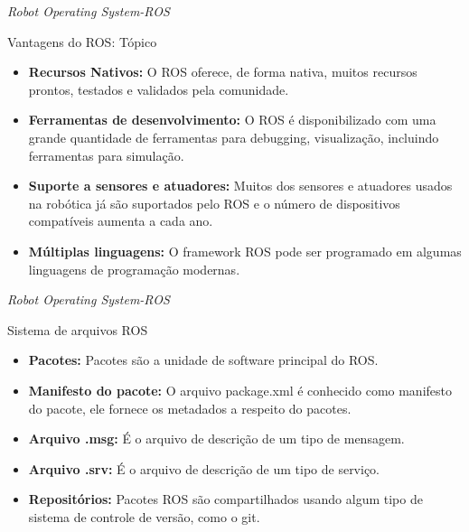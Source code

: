 \documentclass[10pt]{beamer}
\begin{document}
\begin{frame}{\textit{Robot Operating System-ROS}}
	\begin{alertblock}{Vantagens do ROS: Tópico}
		\vspace{0.2cm}
		\begin{itemize}
			\setlength\itemsep{0.7em}
			\item \textbf{Recursos Nativos:} O ROS oferece, de forma nativa, muitos recursos prontos,
			testados e validados pela comunidade.
			\item \textbf{Ferramentas de desenvolvimento:} O ROS é disponibilizado com uma grande quantidade de ferramentas para debugging, visualização, incluindo ferramentas para simulação.
			\item \textbf{Suporte a sensores e atuadores:} Muitos dos sensores e atuadores usados na robótica já são suportados pelo ROS e o número de dispositivos compatíveis aumenta a cada ano.
			\item \textbf{Múltiplas linguagens:} O framework ROS pode ser programado em algumas linguagens de programação modernas.
		\end{itemize}
	\end{alertblock}
\end{frame}

\begin{frame}{\textit{Robot Operating System-ROS}}
	\begin{alertblock}{Sistema de arquivos ROS}
		\vspace{0.2cm}
		\begin{itemize}
			\setlength\itemsep{0.9em}
			\item \textbf{Pacotes:} Pacotes são a unidade de software principal do ROS.
			\item \textbf{Manifesto do pacote:} O arquivo package.xml é conhecido como manifesto do	pacote, ele fornece os metadados a respeito do pacotes.
			\item \textbf{Arquivo .msg:} É o arquivo de descrição de um tipo de mensagem.
			\item \textbf{Arquivo .srv:} É o arquivo de descrição de um tipo de serviço.
			\item \textbf{Repositórios:} Pacotes ROS são compartilhados usando algum tipo de sistema de	controle de versão, como o git.
		\end{itemize}
	\end{alertblock}
\end{frame}
\end{document}
